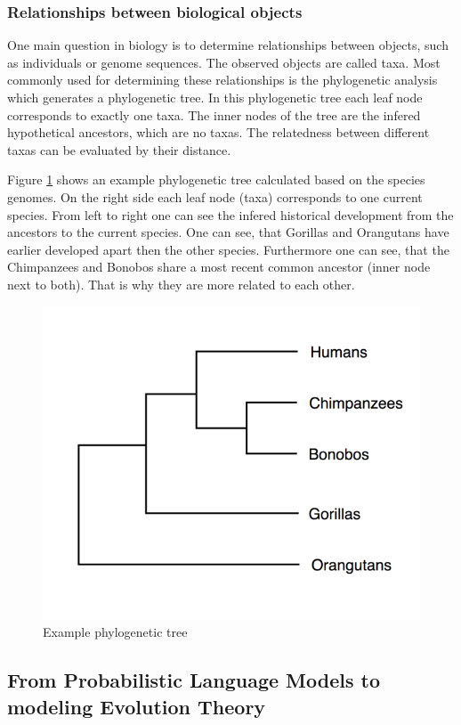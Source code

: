 \subsubsection{Relationships between biological objects} \label{fundamentalsA0d}

One main question in biology is to determine relationships between objects, such as individuals or genome sequences. The observed objects are called taxa. Most commonly used for determining these relationships is the phy\-lo\-ge\-ne\-tic analysis which generates a phy\-lo\-ge\-ne\-tic tree. In this phy\-lo\-ge\-ne\-tic tree each leaf node corresponds to exactly one taxa. The inner nodes of the tree are the infered hypothetical ancestors, which are no taxas. The relatedness between different taxas can be evaluated by their distance. \cite{böckenhauer2013algorithmische}

Figure \ref{examplePhylogeneticTree} shows an example phylogenetic tree calculated based on the species genomes. On the right side each leaf node (taxa) corresponds to one current species. From left to right one can see the infered historical development from the ancestors to the current species. One can see, that Gorillas and Orangutans have earlier developed apart then the other species. Furthermore one can see, that the  Chimpanzees and Bonobos share a most recent common ancestor (inner node next to both). That is why they are more related to each other. \cite{mallawaarachchiMolecularPhylogeneticsUsing2018}

\begin{figure}[ht]
	\centering
	\includegraphics[width=0.5\linewidth]{figures/examplePhylogeneticTree.png}
	\caption{Example phylogenetic tree \cite{mallawaarachchiMolecularPhylogeneticsUsing2018}}
	\label{examplePhylogeneticTree}
\end{figure}

\newpage

\subsection{From Probabilistic Language Models to modeling Evolution Theory} \label{fundamentalsA}

